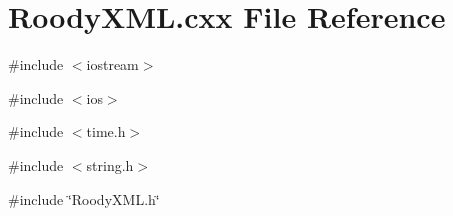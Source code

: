 \section{RoodyXML.cxx File Reference}
\label{RoodyXML_8cxx}
{\ttfamily \#include $<$iostream$>$}\par
{\ttfamily \#include $<$ios$>$}\par
{\ttfamily \#include $<$time.h$>$}\par
{\ttfamily \#include $<$string.h$>$}\par
{\ttfamily \#include \char`\"{}RoodyXML.h\char`\"{}}\par
